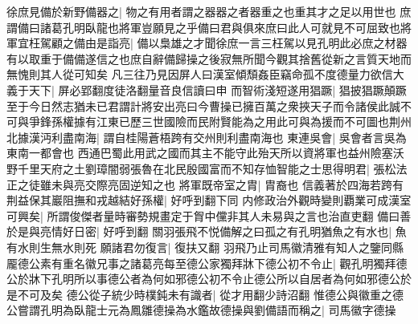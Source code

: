 徐庶見備於新野備器之|{
	物之有用者謂之器器之者器重之也重其才之足以用世也}
庶謂備曰諸葛孔明臥龍也將軍豈願見之乎備曰君與俱來庶曰此人可就見不可屈致也將軍宜枉駕顧之備由是詣亮|{
	備以梟雄之才聞徐庶一言三枉駕以見孔明此必庶之材器有以取重于備備遂信之也庶自辭備歸操之後寂無所聞今觀其捨舊從新之言質天地而無愧則其人從可知矣}
凡三往乃見因屏人曰漢室傾頹姦臣竊命孤不度德量力欲信大義于天下|{
	屏必郢翻度徒洛翻量音良信讀曰申}
而智術淺短遂用猖蹶|{
	猖披猖蹶顛蹶}
至于今日然志猶未已君謂計將安出亮曰今曹操已擁百萬之衆挾天子而令諸侯此誠不可與爭鋒孫權據有江東已歷三世國險而民附賢能為之用此可與為援而不可圖也荆州北據漢沔利盡南海|{
	謂自桂陽蒼梧跨有交州則利盡南海也}
東連吳會|{
	吳會者言吳為東南一都會也}
西通巴蜀此用武之國而其主不能守此殆天所以資將軍也益州險塞沃野千里天府之土劉璋闇弱張魯在北民殷國富而不知存恤智能之士思得明君|{
	張松法正之徒雖未與亮交際亮固逆知之也}
將軍既帝室之胄|{
	胄裔也}
信義著於四海若跨有荆益保其巖阻撫和戎越結好孫權|{
	好呼到翻下同}
内修政治外觀時變則覇業可成漢室可興矣|{
	所謂俊傑者量時審勢規畫定于胷中儻非其人未易與之言也治直吏翻}
備曰善於是與亮情好日密|{
	好呼到翻}
關羽張飛不悦備解之曰孤之有孔明猶魚之有水也|{
	魚有水則生無水則死}
願諸君勿復言|{
	復扶又翻}
羽飛乃止司馬徽清雅有知人之鑒同縣龎德公素有重名徽兄事之諸葛亮每至德公家獨拜牀下德公初不令止|{
	觀孔明獨拜德公於牀下孔明所以事德公者為何如邪德公初不令止德公所以自居者為何如邪德公於是不可及矣}
德公從子統少時樸鈍未有識者|{
	從才用翻少詩沼翻}
惟德公與徽重之德公嘗謂孔明為臥龍士元為鳳雛德操為水鑑故德操與劉備語而稱之|{
	司馬徽字德操}


